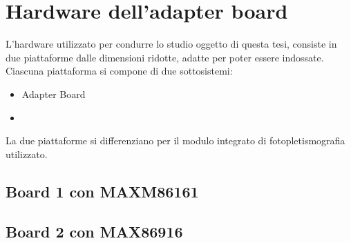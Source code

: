 \section{Hardware dell'adapter board}
L'hardware utilizzato per condurre lo studio oggetto di questa tesi, consiste in due piattaforme dalle dimensioni ridotte, adatte per poter essere indossate. Ciascuna piattaforma si compone di due sottosistemi:
\begin{itemize}
	\item Adapter Board
	\item 
\end{itemize}
La due piattaforme si differenziano per il modulo integrato di fotopletismografia utilizzato. 
\subsection{Board 1 con MAXM86161}

\subsection{Board 2 con MAX86916}